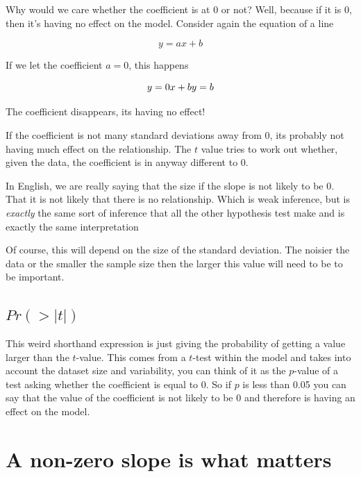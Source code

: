\documentclass[
]{book}
\begin{document}
Why would we care whether the coefficient is at 0 or not? Well, because if it is 0, then it's having no effect on the model. Consider again the equation of a line

\begin{equation}
y = ax + b
\end{equation}

If we let the coefficient \(a = 0\), this happens

\begin{equation}
y = 0 x + b\\
y = b
\end{equation}

The coefficient disappears, its having no effect!

If the coefficient is not many standard deviations away from 0, its probably not having much effect on the relationship. The \(t\) value tries to work out whether, given the data, the coefficient is in anyway different to 0.

In English, we are really saying that the size if the slope is not likely to be 0. That it is not likely that there is no relationship. Which is weak inference, but is \emph{exactly} the same sort of inference that all the other hypothesis test make and is exactly the same interpretation

Of course, this will depend on the size of the standard deviation. The noisier the data or the smaller the sample size then the larger this value will need to be to be important.

\hypertarget{prt}{%
\subsection{\texorpdfstring{\(Pr(>|t|)\)}{Pr(\textgreater\textbar t\textbar)}}\label{prt}}

This weird shorthand expression is just giving the probability of getting a value larger than the \(t\)-value. This comes from a \(t\)-test within the model and takes into account the dataset size and variability, you can think of it as the \(p\)-value of a test asking whether the coefficient is equal to 0. So if \(p\) is less than 0.05 you can say that the value of the coefficient is not likely to be 0 and therefore is having an effect on the model.

\hypertarget{a-non-zero-slope-is-what-matters}{%
\section{A non-zero slope is what matters}\label{a-non-zero-slope-is-what-matters}}
\end{document}

